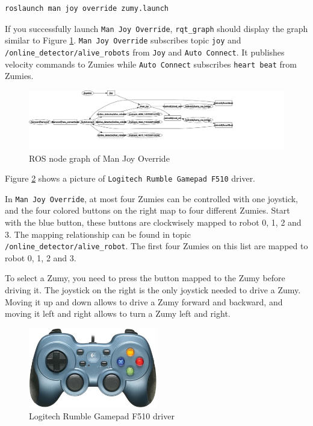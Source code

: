 \documentclass{article}
\begin{document}
\begin{Verbatim}[frame=single]
roslaunch man joy override zumy.launch 
\end{Verbatim} 

If you successfully launch \verb=Man Joy Override=, \verb=rqt_graph= should display the graph similar to Figure \ref{fig:man_joy_override}. \verb=Man Joy Override= subscribes topic \verb=joy= and \verb=/online_detector/alive_robots= from \verb=Joy= and \verb=Auto Connect=. It publishes velocity commands to Zumies while \verb=Auto Connect= subscribes \verb=heart beat= from Zumies.    

\begin{figure}[h]
\centering
\includegraphics[width=1.3\textwidth]{img/man_joy_override.png}
\caption{ROS node graph of Man Joy Override}
\label{fig:man_joy_override}
\end{figure}

Figure \ref{fig:joy} shows a picture of \verb=Logitech Rumble Gamepad F510= driver. 

In \verb=Man Joy Override=, at most four Zumies can be controlled with one joystick, and the four colored buttons on the right map to four different Zumies. Start with the blue button, these buttons are clockwisely mapped to robot 0, 1, 2 and 3. The mapping relationship can be found in topic \verb=/online_detector/alive_robot=. The first four Zumies on this list are mapped to robot 0, 1, 2 and 3. 

To select a Zumy, you need to press the button mapped to the Zumy before driving it. The joystick on the right is the only joystick needed to drive a Zumy. Moving it up and down allows to drive a Zumy forward and backward, and moving it left and right allows to turn a Zumy left and right.   

\begin{figure}[h]
\centering
\includegraphics[width=0.5\textwidth]{img/joystick.jpeg}
\caption{Logitech Rumble Gamepad F510 driver}
\label{fig:joy}
\end{figure}
\end{document}
